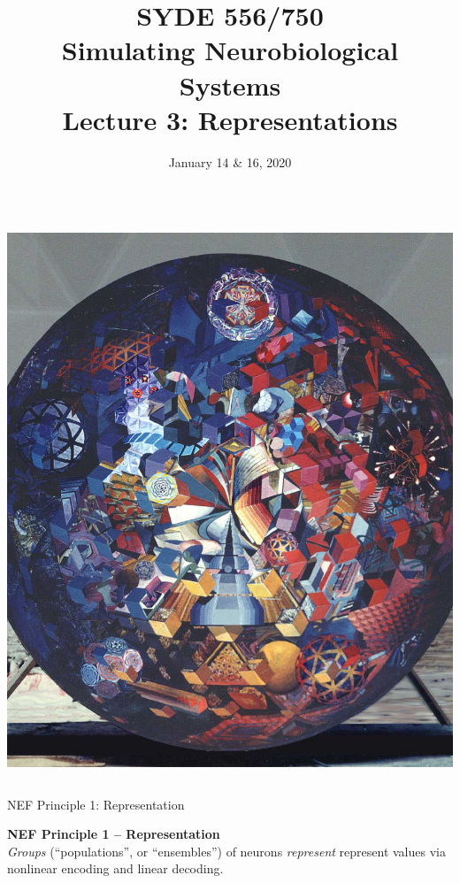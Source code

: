\documentclass[handout,aspectratio=169]{beamer}
\date{January 14 \& 16, 2020}
\title{SYDE 556/750 \\ Simulating Neurobiological Systems \\ Lecture 3: Representations}
\begin{document}
	
\begin{frame}{}
	\vspace{0.5cm}
	\begin{columns}[c]
		\MakeTitle
		\includegraphics[width=\textwidth]{media/cubism_the_ultimate_painting_small.jpg}
	\end{columns}
\end{frame}



\begin{frame}{NEF Principle 1: Representation}
	\begin{mdframed}
		\textbf{NEF Principle 1 -- Representation}\\
		\emph{Groups} (\enquote{populations}, or \enquote{ensembles}) of neurons \emph{represent} represent values via nonlinear encoding and linear decoding.
	\end{mdframed}
\end{frame}
\end{document}
